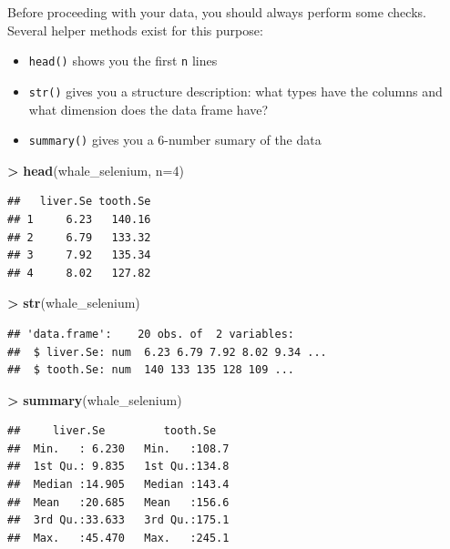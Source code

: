 \documentclass[]{book}
\newenvironment{Shaded}{\begin{snugshade}}{\end{snugshade}}
\newcommand{\DataTypeTok}[1]{\textcolor[rgb]{0.13,0.29,0.53}{#1}}
\newcommand{\DecValTok}[1]{\textcolor[rgb]{0.00,0.00,0.81}{#1}}
\newcommand{\KeywordTok}[1]{\textcolor[rgb]{0.13,0.29,0.53}{\textbf{#1}}}
\newcommand{\NormalTok}[1]{#1}
\newcommand{\OperatorTok}[1]{\textcolor[rgb]{0.81,0.36,0.00}{\textbf{#1}}}
\newcommand{\StringTok}[1]{\textcolor[rgb]{0.31,0.60,0.02}{#1}}
\providecommand{\tightlist}{%
  \setlength{\itemsep}{0pt}\setlength{\parskip}{0pt}}
\begin{document}
Before proceeding with your data, you should always perform some checks. Several helper methods exist for this purpose:

\begin{itemize}
\tightlist
\item
  \texttt{head()} shows you the first \texttt{n} lines
\item
  \texttt{str()} gives you a structure description: what types have the columns and what dimension does the data frame have?
\item
  \texttt{summary()} gives you a 6-number sumary of the data
\end{itemize}

\begin{Shaded}
\begin{Highlighting}[]
\OperatorTok{>}\StringTok{ }\KeywordTok{head}\NormalTok{(whale_selenium, }\DataTypeTok{n=}\DecValTok{4}\NormalTok{) }
\end{Highlighting}
\end{Shaded}

\begin{verbatim}
##   liver.Se tooth.Se
## 1     6.23   140.16
## 2     6.79   133.32
## 3     7.92   135.34
## 4     8.02   127.82
\end{verbatim}

\begin{Shaded}
\begin{Highlighting}[]
\OperatorTok{>}\StringTok{ }\KeywordTok{str}\NormalTok{(whale_selenium) }
\end{Highlighting}
\end{Shaded}

\begin{verbatim}
## 'data.frame':    20 obs. of  2 variables:
##  $ liver.Se: num  6.23 6.79 7.92 8.02 9.34 ...
##  $ tooth.Se: num  140 133 135 128 109 ...
\end{verbatim}

\begin{Shaded}
\begin{Highlighting}[]
\OperatorTok{>}\StringTok{ }\KeywordTok{summary}\NormalTok{(whale_selenium) }
\end{Highlighting}
\end{Shaded}

\begin{verbatim}
##     liver.Se         tooth.Se    
##  Min.   : 6.230   Min.   :108.7  
##  1st Qu.: 9.835   1st Qu.:134.8  
##  Median :14.905   Median :143.4  
##  Mean   :20.685   Mean   :156.6  
##  3rd Qu.:33.633   3rd Qu.:175.1  
##  Max.   :45.470   Max.   :245.1
\end{verbatim}
\end{document}
